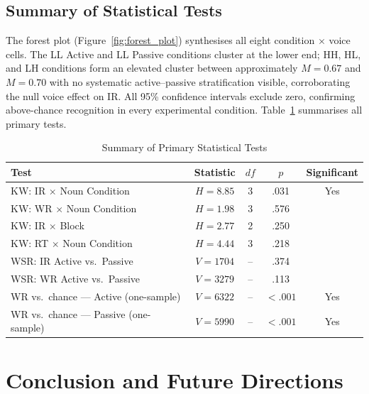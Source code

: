 \documentclass[12pt, a4paper]{article}
\begin{document}
\subsection{Summary of Statistical Tests}

The forest plot (Figure~\ref{fig:forest_plot}) synthesises all eight
condition $\times$ voice cells. The LL Active and LL Passive conditions cluster
at the lower end; HH, HL, and LH conditions form an elevated cluster between
approximately $M = 0.67$ and $M = 0.70$ with no systematic active--passive
stratification visible, corroborating the null voice effect on IR. All 95\%
confidence intervals exclude zero, confirming above-chance recognition in every
experimental condition. Table~\ref{tab:tests} summarises all primary tests.

\begin{table}[H]
\centering
\caption{Summary of Primary Statistical Tests}
\label{tab:tests}
\begin{tabular}{@{}lcccc@{}}
\toprule
Test & Statistic & $df$ & $p$ & Significant \\ \midrule
KW: IR $\times$ Noun Condition          & $H = 8.85$ & 3  & .031        & Yes \\
KW: WR $\times$ Noun Condition          & $H = 1.98$ & 3  & .576        &     \\
KW: IR $\times$ Block                   & $H = 2.77$ & 2  & .250        &     \\
KW: RT $\times$ Noun Condition          & $H = 4.44$ & 3  & .218        &     \\
WSR: IR Active vs.\ Passive             & $V = 1704$ & -- & .374        &     \\
WSR: WR Active vs.\ Passive             & $V = 3279$ & -- & .113        &     \\
WR vs.\ chance --- Active (one-sample)  & $V = 6322$ & -- & $< .001$    & Yes \\
WR vs.\ chance --- Passive (one-sample) & $V = 5990$ & -- & $< .001$    & Yes \\
\bottomrule
\end{tabular}
\end{table}


\section{Conclusion and Future Directions}
\end{document}
